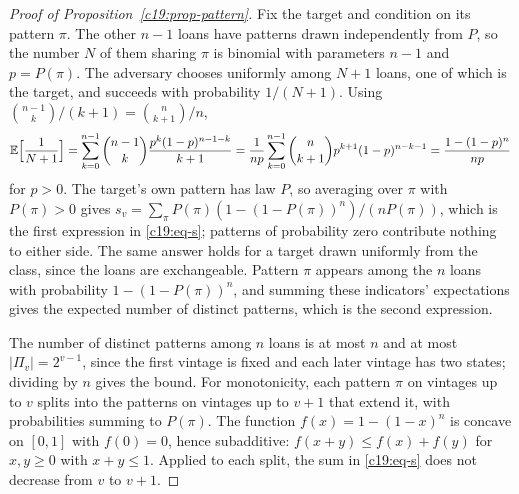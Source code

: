 \begin{proof}[Proof of Proposition~\ref{c19:prop-pattern}]
Fix the target and condition on its pattern $\pi$. The other $n-1$ loans have patterns drawn independently from $P$, so the number $N$ of them sharing $\pi$ is binomial
with parameters $n-1$ and $p=P(\pi)$. The adversary chooses uniformly among $N+1$ loans,
one of which is the target, and succeeds with probability $1/(N+1)$. Using $\binom{n-1}{k}/(k+1)=\binom{n}{k+1}/n$,
\[\mathbb{E}\Big[\frac1{N+1}\Big]=\sum_{k=0}^{n-1}\binom{n-1}{k}\frac{p^k(1-p)^{n-1-k}}{k+1}=\frac1{np}\sum_{k=0}^{n-1}\binom{n}{k+1}p^{k+1}(1-p)^{n-k-1}=\frac{1-(1-p)^n}{np}\]
for $p>0$. The target's own pattern has law $P$, so averaging over $\pi$ with $P(\pi)>0$ gives
$s_v=\sum_\pi P(\pi)(1-(1-P(\pi))^n)/(nP(\pi))$, which is the first expression in \eqref{c19:eq-s}; patterns of
probability zero contribute nothing to either side. The same answer holds for a target drawn
uniformly from the class, since the loans are exchangeable. Pattern $\pi$ appears among the $n$
loans with probability $1-(1-P(\pi))^n$, and summing these indicators' expectations gives
the expected number of distinct patterns, which is the second expression.

The number of distinct patterns among $n$ loans is at most $n$ and at most $|\Pi_v|=2^{v-1}$, since
the first vintage is fixed and each later vintage has two states; dividing by $n$ gives the bound.
For monotonicity, each pattern $\pi$ on vintages up to $v$ splits into the patterns on vintages up
to $v+1$ that extend it, with probabilities summing to $P(\pi)$. The function $f(x)=1-(1-x)^n$
is concave on $[0,1]$ with $f(0)=0$, hence subadditive: $f(x+y)\le f(x)+f(y)$ for $x,y\ge0$
with $x+y\le1$. Applied to each split, the sum in \eqref{c19:eq-s} does not decrease from $v$ to $v+1$.
\end{proof}


